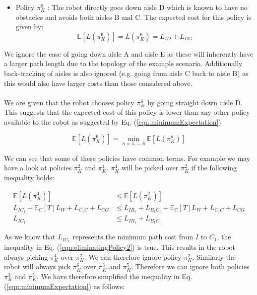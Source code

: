 \documentclass[a4paper,12pt]{article}
\begin{document}
\begin{itemize}
				\item Policy $\pi_{K}^{6}$ : The robot directly goes down aisle D which is known to have no obstacles and avoids both aisles B and C. The expected cost for this policy is given by:
					\begin{equation}
						\mathbb{E}\left[L\left(\pi_{K}^{6}\right)\right] = L\left(\pi_{K}^{6}\right) = L_{ID} + L_{DG}
					\label{eqn:policySixCost}
					\end{equation}
			\end{itemize}
		
			We ignore the case of going down aisle A and aisle E as these will inherently have a larger path length due to the topology of the example scenario. Additionally back-tracking of aisles is also ignored (e.g. going from aisle C back to aisle B) as this would also have larger costs than those considered above.
			\\
			\\
			We are given that the robot chooses policy $\pi_{K}^{6}$ by going straight down aisle D. This suggests that the expected cost of this policy is lower than any other policy available to the robot as suggested by Eq. (\ref{eqn:minimumExpectation})
			
			\begin{equation}
				\mathbb{E}\left[L\left(\pi_{K}^{6}\right)\right] = \min_{n=1,\dots,6} \mathbb{E}\left[L\left(\pi_{K}^{n}\right)\right]
			\label{eqn:minimumExpectation}
			\end{equation}
	
			We can see that some of these policies have common terms. For example we may have a look at policies $\pi_{K}^{2}$ and $\pi_{K}^{4}$. $\pi_{K}^{4}$ will be picked over $\pi_{K}^{2}$ if the following inequality holds:
	
			\begin{equation}
			\begin{split}
				\mathbb{E}\left[L\left(\pi_{K}^{4}\right)\right] &\leq \mathbb{E}\left[L\left(\pi_{K}^{2}\right)\right] \\
				L_{IC_1} + \mathbb{E}_{C}\left[T\right]L_W + L_{C_1C} + L_{CG} &\leq L_{IB_1} + L_{B_1C_1} + \mathbb{E}_{C}\left[T\right]L_W + L_{C_1C} + L_{CG} \\
				L_{IC_1} &\leq L_{IB_1} + L_{B_1C_1}
			\end{split}
			\label{eqn:eliminatingPolicy2}
			\end{equation}
	
			As we know that $L_{IC_1}$ represents the minimum path cost from $I$ to $C_1$, the inequality in Eq. (\ref{eqn:eliminatingPolicy2}) is true. This results in the robot always picking $\pi_{K}^{4}$ over $\pi_{K}^{2}$. We can therefore ignore policy $\pi_{K}^{2}$. Similarly the robot will always pick $\pi_{K}^{6}$ over $\pi_{K}^{3}$ and $\pi_{K}^{5}$. Therefore we can ignore both policies $\pi_{K}^{3}$ and $\pi_{K}^{5}$. We have therefore simplified the inequality in Eq. (\ref{eqn:minimumExpectation}) as follows:
			
\end{document}
